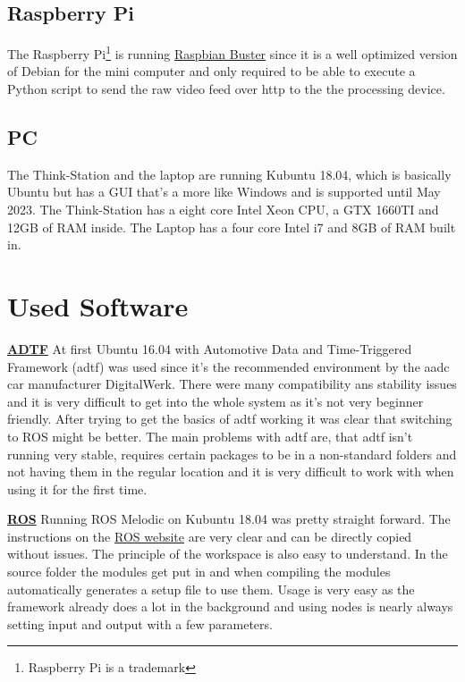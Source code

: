 \subsection{Raspberry Pi}
The Raspberry Pi\texttrademark \footnote{Raspberry Pi is a trademark} is running \href{https://www.raspberrypi.org/downloads/raspbian/}{Raspbian Buster} since it is a well optimized version of Debian for the mini computer and only required to be able to execute a Python script to send the raw video feed over http to the the processing device.\newline

\subsection{PC}
The Think-Station and the laptop are running Kubuntu 18.04, which is basically Ubuntu but has a GUI that's a more like Windows and is supported until May 2023. \newline
The Think-Station has a eight core Intel Xeon CPU, a GTX 1660TI and 12GB of RAM inside. \newline
The Laptop has a four core Intel i7 and 8GB of RAM built in.


\section{Used Software\authorA}
\textbf{\underline{ADTF}} \newline
At first Ubuntu 16.04 with Automotive Data and Time-Triggered Framework (\gls{adtf}) was used since it's the recommended environment by the \gls{aadc} car manufacturer DigitalWerk. There were many compatibility ans stability issues and it is very difficult to get into the whole system as it's not very beginner friendly. After trying to get the basics of \gls{adtf} working it was clear that switching to ROS might be better. The main problems with \gls{adtf} are, that \gls{adtf} isn't running very stable, requires certain packages to be in a non-standard folders and not having them in the regular location and it is very difficult to work with when using it for the first time.

\textbf{\underline{ROS}} \newline
Running ROS Melodic on Kubuntu 18.04 was pretty straight forward. The instructions on the \href{https://wiki.ros.org/melodic/Installation}{ROS website} \cite{installros} are very clear and can be directly copied without issues. The principle of the workspace is also easy to understand. In the source folder the modules get put in and when compiling the modules automatically generates a setup file to use them. Usage is very easy as the framework already does a lot in the background and using nodes is nearly always setting input and output with a few parameters.

